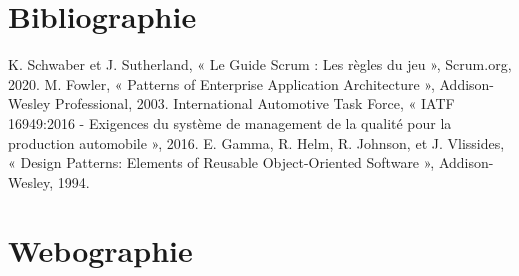 \chapter*{Bibliographie}

\noindent [1] K. Schwaber et J. Sutherland, « Le Guide Scrum : Les règles du jeu », Scrum.org, 2020. \newline
\noindent [2] M. Fowler, « Patterns of Enterprise Application Architecture », Addison-Wesley Professional, 2003. \newline
\noindent [3] International Automotive Task Force, « IATF 16949:2016 - Exigences du système de management de la qualité pour la production automobile », 2016. \newline
\noindent [4] E. Gamma, R. Helm, R. Johnson, et J. Vlissides, « Design Patterns: Elements of Reusable Object-Oriented Software », Addison-Wesley, 1994. \newline

\chapter*{Webographie}

